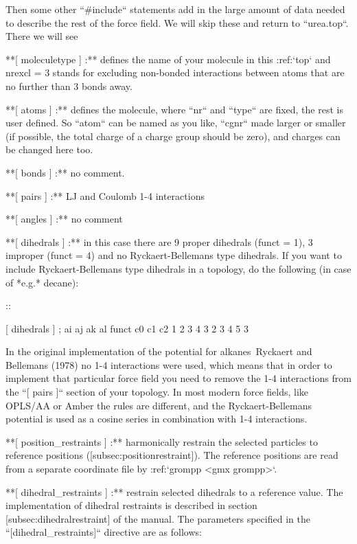 Then some other ``#include`` statements add in the large
amount of data needed to describe the rest of the force field. We will
skip these and return to ``urea.top``. There we will see

**[ moleculetype ] :** defines the name of your molecule
in this :ref:`top` and nrexcl = 3 stands for excluding
non-bonded interactions between atoms that are no further than 3 bonds
away.

**[ atoms ] :** defines the molecule, where
``nr`` and ``type`` are fixed, the rest is user
defined. So ``atom`` can be named as you like,
``cgnr`` made larger or smaller (if possible, the total
charge of a charge group should be zero), and charges can be changed
here too.

**[ bonds ] :** no comment.

**[ pairs ] :** LJ and Coulomb 1-4 interactions

**[ angles ] :** no comment

**[ dihedrals ] :** in this case there are 9 proper
dihedrals (funct = 1), 3 improper (funct = 4) and no Ryckaert-Bellemans
type dihedrals. If you want to include Ryckaert-Bellemans type dihedrals
in a topology, do the following (in case of *e.g.* decane):

::

    [ dihedrals ]
    ;  ai    aj    ak    al funct       c0       c1       c2
        1    2     3     4     3 
        2    3     4     5     3

In the original implementation of the potential for alkanes Ryckaert and
Bellemans (1978) no 1-4 interactions were used, which means that in
order to implement that particular force field you need to remove the
1-4 interactions from the ``[ pairs ]`` section of your
topology. In most modern force fields, like OPLS/AA or Amber the rules
are different, and the Ryckaert-Bellemans potential is used as a cosine
series in combination with 1-4 interactions.

 **[ position_restraints ] :** harmonically restrain the selected particles to reference
positions ([subsec:positionrestraint]). The reference positions are read
from a separate coordinate file by :ref:`grompp <gmx grompp>`.

 **[ dihedral_restraints ] :** restrain selected dihedrals to a reference value. The
implementation of dihedral restraints is described in section
[subsec:dihedralrestraint] of the manual. The parameters specified in
the ``[dihedral_restraints]`` directive are as follows:

